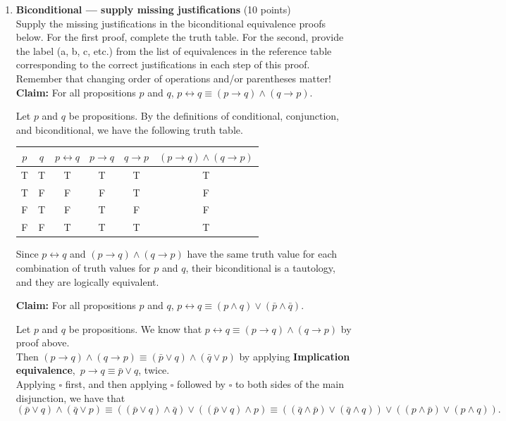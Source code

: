 \begin{enumerate}
  \newpage

  \item \textbf{Biconditional — supply missing justifications} (10 points)\\
  Supply the missing justifications in the biconditional equivalence proofs below. 
  For the first proof, complete the truth table. For the second, provide the label 
  (a, b, c, etc.) from the list of equivalences in the reference table corresponding 
  to the correct justifications in each step of this proof. Remember that changing 
  order of operations and/or parentheses matter!\\

  \textbf{Claim:} For all propositions $p$ and $q$, $p \leftrightarrow q \equiv (p \rightarrow q) \wedge (q \rightarrow p)$.\\
  \begin{subprove}
    Let $p$ and $q$ be propositions. By the definitions of conditional, conjunction, and biconditional, we have the following truth table.

    \begin{center}
    \begin{tabular}{|c|c|c|c|c|c|}
    \hline
    $p$ & $q$ & $p \leftrightarrow q$ & $p \rightarrow q$ & $q \rightarrow p$ & $(p \rightarrow q) \wedge (q \rightarrow p)$ \\
    \hline
    T & T & T & T & T & T \\
    \hline
    T & F & F & F & T & F \\
    \hline
    F & T & F & T & F & F \\
    \hline
    F & F & T & T & T & T \\
    \hline
    \end{tabular}
    \end{center}

    Since $p \leftrightarrow q$ and $(p \rightarrow q) \wedge (q \rightarrow p)$ have the 
    same truth value for each combination of truth values for $p$ and $q$, their 
    biconditional is a tautology, and they are logically equivalent.
  \end{subprove}


  \textbf{Claim:} For all propositions $p$ and $q$, $p \leftrightarrow q \equiv (p \wedge q) \vee (\bar{p} \wedge \bar{q})$.\\
  \begin{subprove}
    Let $p$ and $q$ be propositions. We know that 
    $p \leftrightarrow q \equiv (p \rightarrow q) \wedge (q \rightarrow p)$ by proof above. \\
    Then $(p \rightarrow q) \wedge (q \rightarrow p) \equiv (\bar{p} \vee q) \wedge (\bar{q} \vee p)$ 
    by applying \textbf{Implication equivalence}, $\,p \rightarrow q \equiv \bar{p} \vee q$, twice. \\
    Applying $\square$ first, and then applying $\square$ followed by $\square$ to both sides of the main disjunction, we have that
    $$
    (\bar{p} \vee q) \wedge (\bar{q} \vee p) \equiv ((\bar{p} \vee q) \wedge \bar{q}) \vee ((\bar{p} \vee q) \wedge p) \equiv ((\bar{q} \wedge \bar{p}) \vee (\bar{q} \wedge q)) \vee ((p \wedge \bar{p}) \vee (p \wedge q)).
    $$


\end{subprove}
\end{enumerate}
